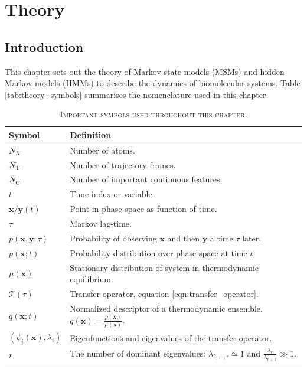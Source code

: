 %
\let\textcircled=\pgftextcircled
\chapter{Theory}
\label{chap:theory}

\section{Introduction}
This chapter sets out the theory of Markov state models (MSMs) and hidden Markov models (HMMs) to describe the dynamics of biomolecular systems. Table \ref{tab:theory_symbols} summarises the  nomenclature used in this chapter. 

\begin{table}
    \centering
    \caption[Important symbols]{\textsc{Important symbols used throughout this chapter.}}
    \begin{tabularx}{0.9\textwidth}{ |l| >{\raggedright\arraybackslash}X | } 
        \hline
        \textbf{Symbol}  &  \textbf{Definition} \\
        \hline\hline
        $N_{\mathrm{A}}$ & Number of atoms. \\
        $N_{\mathrm{T}}$ & Number of trajectory frames. \\
        $N_{\mathrm{C}}$ & Number of important continuous features  \\
        $t$ & Time index or variable. \\
        $\mathbf{x}/\mathbf{y}(t)$ & Point in phase space as function of time. \\
        $\tau$ & Markov lag-time. \\
        $p(\mathbf{x}, \mathbf{y}; \tau)$ & Probability of observing $\mathbf{x}$ and then $\mathbf{y}$ a time $\tau$ later. \\
        $p(\mathbf{x}; t)$ & Probability distribution over phase space at time $t$. \\
        $\mu(\mathbf{x})$ & Stationary distribution of system in thermodynamic equilibrium.  \\ 
        $\mathcal{T}(\tau)$ & Transfer operator, equation \ref{eqn:transfer_operator}.  \\
        $q(\mathbf{x}; t)$ & Normalized descriptor of a thermodynamic ensemble. $q(\mathbf{x}) = \frac{p(\mathbf{x})}{\mu(\mathbf{x})}$. \\
        $(\psi_{i}(\mathbf{x}), \lambda_{i})$ & Eigenfunctions and eigenvalues of the transfer operator.  \\
        $r$ & The number of dominant eigenvalues: $\lambda_{2,\ldots, r}\simeq 1$ and $\frac{\lambda_{r}}{\lambda_{r+1}} \gg 1$. \\

\end{tabularx}
\end{table}
